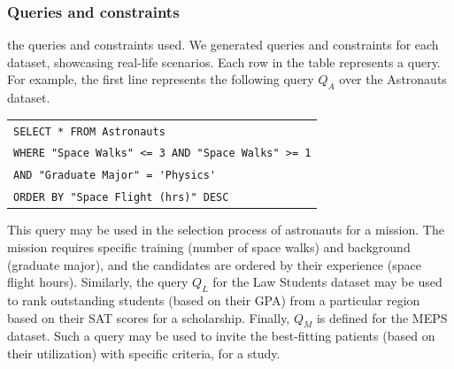 \subsubsection*{Queries and constraints} %
  the queries and constraints used.
 We generated queries and constraints for each dataset, showcasing real-life scenarios. Each row in the table represents a query. %
 For example, the first line represents the following query 
 $Q_A$ over the Astronauts dataset. 
 \begin{center}
     \footnotesize
     \begin{tabular}{l}
        \verb"SELECT * FROM Astronauts" \\
        \verb|WHERE "Space Walks" <= 3 AND "Space Walks" >= 1| \\
        \verb|AND "Graduate Major" = 'Physics'|\\
        \verb|ORDER BY "Space Flight (hrs)" DESC|\\
     \end{tabular}
     \end{center}
     This query may be used in the selection process of astronauts for a mission. The mission requires specific training (number of space walks) and background (graduate major), and the candidates are ordered by their experience (space flight hours).  
     Similarly, the query $Q_L$ for the Law Students dataset may be used to rank outstanding students (based on their GPA) from a particular region based on their SAT scores for a scholarship. Finally, $Q_M$ is defined for the MEPS dataset.  Such a query may be used to invite the best-fitting patients (based on their utilization) with specific criteria, for a study.
     

